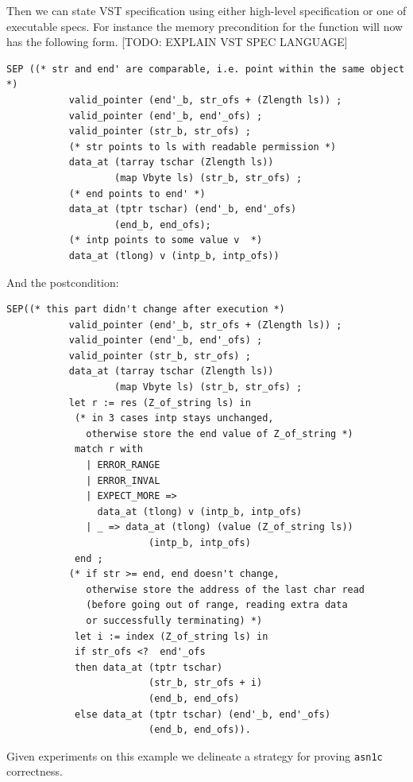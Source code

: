 \documentclass[acmsmall,nonacm]{acmart}
\begin{document}
Then we can state VST specification using either high-level specification or one of executable specs. For instance the memory precondition for the function will now has the following form. [TODO: EXPLAIN VST SPEC LANGUAGE]
\begin{lstlisting}[language=Coq]
SEP ((* str and end' are comparable, i.e. point within the same object *)
           valid_pointer (end'_b, str_ofs + (Zlength ls)) ;
           valid_pointer (end'_b, end'_ofs) ;
           valid_pointer (str_b, str_ofs) ;
           (* str points to ls with readable permission *)
           data_at (tarray tschar (Zlength ls)) 
                   (map Vbyte ls) (str_b, str_ofs) ; 
           (* end points to end' *)
           data_at (tptr tschar) (end'_b, end'_ofs) 
                   (end_b, end_ofs);
           (* intp points to some value v  *)
           data_at (tlong) v (intp_b, intp_ofs))
           \end{lstlisting}

And the postcondition:
           
\begin{lstlisting}[language=Coq]
 SEP((* this part didn't change after execution *)
           valid_pointer (end'_b, str_ofs + (Zlength ls)) ;
           valid_pointer (end'_b, end'_ofs) ;
           valid_pointer (str_b, str_ofs) ;
           data_at (tarray tschar (Zlength ls)) 
                   (map Vbyte ls) (str_b, str_ofs) ; 
           let r := res (Z_of_string ls) in
            (* in 3 cases intp stays unchanged,
              otherwise store the end value of Z_of_string *)
            match r with 
              | ERROR_RANGE 
              | ERROR_INVAL 
              | EXPECT_MORE => 
                data_at (tlong) v (intp_b, intp_ofs)
              | _ => data_at (tlong) (value (Z_of_string ls))
                         (intp_b, intp_ofs) 
            end ;
           (* if str >= end, end doesn't change, 
              otherwise store the address of the last char read 
              (before going out of range, reading extra data 
              or successfully terminating) *)
            let i := index (Z_of_string ls) in
            if str_ofs <?  end'_ofs
            then data_at (tptr tschar) 
                         (str_b, str_ofs + i) 
                         (end_b, end_ofs)
            else data_at (tptr tschar) (end'_b, end'_ofs) 
                         (end_b, end_ofs)).
\end{lstlisting}

Given experiments on this example we delineate a strategy for proving
\texttt{asn1c} correctness.
\end{document}
